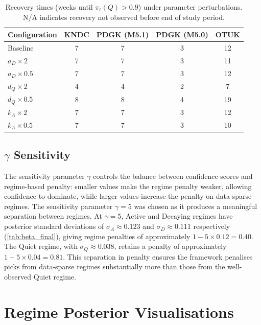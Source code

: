 \begin{table}[h]
    \centering
    \caption{Recovery times (weeks until $\pi_t(Q) > 0.9$) under parameter 
    perturbations. N/A indicates recovery not observed before end of study period.}
    \label{tab:sensitivity}
    \small
    \begin{tabular}{@{}lcccc@{}}
        \toprule
        Configuration & KNDC & PDGK (M5.1) & PDGK (M5.0) & OTUK \\
        \midrule
        Baseline         & 7 & 7 & 3 & 12  \\
        $a_D \times 2$   & 7 & 7 & 3 & 11  \\
        $a_D \times 0.5$ & 7 & 7 & 3 & 12  \\
        $d_Q \times 2$   & 4 & 4 & 2 & 7   \\
        $d_Q \times 0.5$ & 8 & 8 & 4 & 19  \\
        $k_A \times 2$   & 7 & 7 & 3 & 12  \\
        $k_A \times 0.5$ & 7 & 7 & 3 & 10  \\
        \bottomrule
    \end{tabular}
\end{table}

\subsection{\texorpdfstring{$\gamma$}{Gamma} Sensitivity}
\label{app:sensitivity}

The sensitivity parameter $\gamma$ controls the 
balance between confidence scores and regime-based penalty: smaller values make the regime penalty weaker, 
allowing confidence to dominate, while larger values increase the penalty on data-sparse regimes. The sensitivity parameter $\gamma = 5$ was chosen as it produces a meaningful separation between regimes. At $\gamma = 5$, Active and Decaying regimes have posterior standard deviations of $\sigma_A \approx 0.123$ and $\sigma_D \approx 0.111$ respectively (\cref{tab:beta_final}), giving regime penalties of approximately $1 - 5 \times 0.12 = 0.40$. The Quiet regime, with $\sigma_Q \approx 0.038$, retains a penalty of approximately $1 - 5 \times 0.04 = 0.81$.  This separation in penalty ensures the framework penalises picks from data-sparse regimes substantially more than those from the well-observed Quiet regime.

\section{Regime Posterior Visualisations}
\label{app:posteriors}

